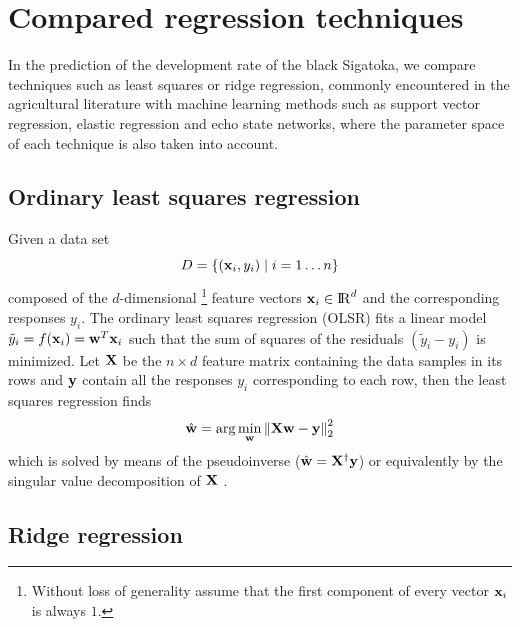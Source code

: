 \section{Compared regression techniques}
\label{sec:techs}

In the prediction of the development rate of the black Sigatoka, we
compare techniques such as least squares or ridge regression, commonly
encountered in the agricultural literature with machine learning
methods such as support vector regression, elastic regression and echo
state networks, where the parameter space of each technique is also
taken into account.

\subsection{Ordinary least squares regression}

Given a data set 
\begin{equation}
  D=\left\{(\mathbf{x}_i,y_i) \mid i=1\ldots n\right\}
\end{equation}
composed of the $d$-dimensional%
\footnote{Without loss of generality assume that the first component
  of every vector $\mathbf{x}_i$ is always $1$.}
%
feature vectors $\mathbf{x}_i\in\mathrm{I\negthinspace R}^d$ and the corresponding responses
$y_i$.
%
The ordinary least squares regression (OLSR) fits a linear model
$\tilde{y}_i = f(\mathbf{x}_i) = \mathbf{w}^T\mathbf{x}_i$ such that the sum of
squares of the residuals $(\tilde{y}_i-y_i)$ is minimized.
%
Let $\mathbf{X}$ be the $n\times{}d$ feature matrix containing the data
samples in its rows and $\mathbf{y}$ contain all the responses $y_i$
corresponding to each row, then the least squares regression finds
\begin{equation*}
  \hat{\mathbf{w}} =
  \arg\min_{\mathbf{w}}\left\| \mathbf{X}\mathbf{w} - \mathbf{y}\right\|_2^2
\end{equation*}
which is solved by means of the pseudoinverse
($\hat{\mathbf{w}}=\mathbf{X}^\dagger\mathbf{y}$) or equivalently by the singular
value decomposition of $\mathbf{X}$ \citep{Press2007}.


\subsection{Ridge regression}

